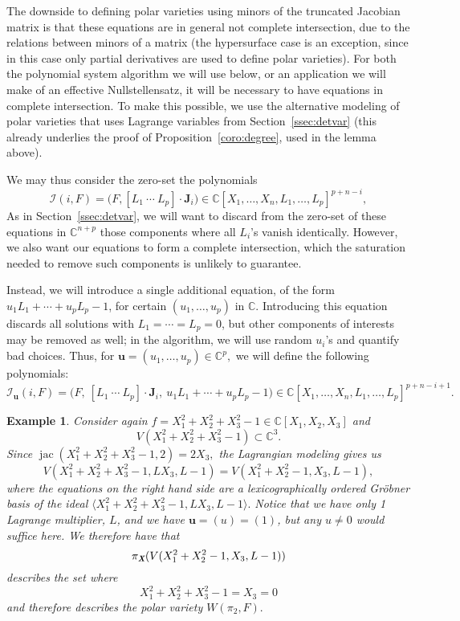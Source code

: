 \documentclass[12pt]{article}
\def\sI{\mathscr{I}}
\def\Xb{\textit{\textbf{X}}}
\def\ub{{\bm u}}
\DeclareMathOperator{\jac}{jac}
\def\C{\mathbb{C}}
\def\Iil{\mathscr{I}_{\ub}(i,F)}
\def\la{\langle}
\def\ra{\rangle}
\newtheorem{ex}[theorem]{Example}
\begin{document}
The downside to defining polar varieties using minors of the truncated
Jacobian matrix is that these equations are in general not complete
intersection, due to the relations between minors of a matrix (the
hypersurface case is an exception, since in this case only partial
derivatives are used to define polar varieties). For both the
polynomial system algorithm we will use below, or an application we
will make of an effective Nullstellensatz, it will be necessary to
have equations in complete intersection. To make this possible, we use
the alternative modeling of polar varieties that uses Lagrange
variables from Section~\ref{ssec:detvar} (this already underlies the
proof of Proposition~\ref{coro:degree}, used in the lemma above).

We may thus consider the zero-set the polynomials
\begin{equation}\label{eqdef:sIif}
  \sI(i,F)
  = \big(F, [L_1~\cdots~L_p]\cdot \bm J_i\big ) \in \C[X_1,\dots,X_n,L_1,\dots,L_p]^{p+n-i},
\end{equation}
As in Section~\ref{ssec:detvar}, we will want to discard from the
zero-set of these equations in $\C^{n+p}$ those components where all
$L_i$'s vanish identically. However, we also want our equations to
form a complete intersection, which the saturation needed to remove
such components is unlikely to guarantee.

Instead, we will introduce a single additional equation, of the form
$u_1 L_1 + \cdots + u_p L_p -1$, for certain $(u_1,\dots,u_p)$ in
$\C$. Introducing this equation discards all solutions with $L_1 =
\cdots = L_p =0$, but other components of interests may be removed as
well; in the algorithm, we will use random $u_i$'s and quantify bad
choices. Thus, for $\ub = (u_1,\hdots,u_p) \in \C^p,$ we will define the 
following polynomials:
\begin{equation}\label{eqdef:Iil}
\Iil= 
\big (F,\ [L_1~\cdots~L_p]\cdot \bm J_i,\ u_1 L_1 + \cdots + u_p L_p -1 \big )
\in \C[X_1,\dots,X_n,L_1,\dots,L_p]^{p+n-i+1}.
\end{equation}
\begin{ex}
Consider again $f=X_1^2 + X_2^2 + X_3^2-1 \in \C[X_1,X_2,X_3]$ and
\[V(X_1^2 + X_2^2 + X_3^2-1)\subset \C^3.\]
Since $\jac(X_1^2 + X_2^2 + X_3^2-1,2)=2X_3,$ the Lagrangian modeling
gives us
\[
 V(X_1^2 + X_2^2 + X_3^2-1, LX_3, L-1) = V(X_1^2 + X_2^2-1,X_3,L-1),
\]
where the equations on the right hand side are a lexicographically
ordered Gr\"obner basis of the ideal $\la X_1^2 + X_2^2 + X_3^2-1,
LX_3, L-1 \ra.$ Notice that we have only 1 Lagrange multiplier, $L$,
and we have $\ub=(u)=(1)$, but any $u \not = 0$ would suffice here. We
therefore have that \[ \pi_{\Xb}(V(X_1^2 + X_2^2-1,X_3,L-1))\]
describes the set where
\[ X_1^2 + X_2^2 + X_3^2-1 = X_3 = 0\] and therefore describes the polar variety $W(\pi_2,F).$
\end{ex}
\end{document}
